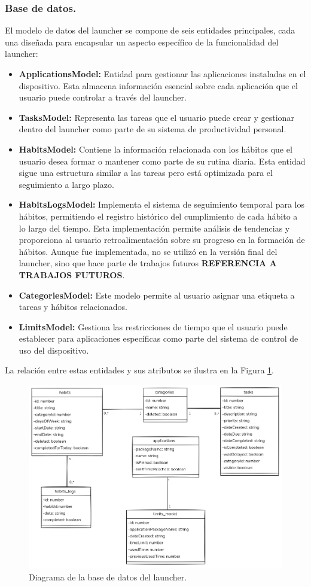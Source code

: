 \subsubsection{Base de datos.}

El modelo de datos del launcher se compone de seis entidades principales, cada una diseñada para encapsular un aspecto específico de la funcionalidad del launcher:

\begin{itemize}
  \item \textbf{ApplicationsModel:} Entidad para gestionar las aplicaciones instaladas en el dispositivo. Esta almacena información esencial sobre cada aplicación que el usuario puede controlar a través del launcher.
  \item \textbf{TasksModel:} Representa las tareas que el usuario puede crear y gestionar dentro del launcher como parte de su sistema de productividad personal.
  \item \textbf{HabitsModel:} Contiene la información relacionada con los hábitos que el usuario desea formar o mantener como parte de su rutina diaria. Esta entidad sigue una estructura similar a las tareas pero está optimizada para el seguimiento a largo plazo.
  \item \textbf{HabitsLogsModel:} Implementa el sistema de seguimiento temporal para los hábitos, permitiendo el registro histórico del cumplimiento de cada hábito a lo largo del tiempo. Esta implementación permite análisis de tendencias y proporciona al usuario retroalimentación sobre su progreso en la formación de hábitos. Aunque fue implementada, no se utilizó en la versión final del launcher, sino que hace parte de trabajos futuros \textbf{REFERENCIA A TRABAJOS FUTUROS}.
  \item \textbf{CategoriesModel:} Este modelo permite al usuario asignar una etiqueta a tareas y hábitos relacionados.
  \item \textbf{LimitsModel:} Gestiona las restricciones de tiempo que el usuario puede establecer para aplicaciones específicas como parte del sistema de control de uso del dispositivo.
\end{itemize}


La relación entre estas entidades y sus atributos se ilustra en la Figura \ref{fig:diagrama_uml}.

\begin{figure}[ht]
  \caption{Diagrama de la base de datos del launcher.}
  \label{fig:diagrama_uml}
  \includegraphics[width=\textwidth]{Figuras/diagrama_uml.png}
  \centering
\end{figure}